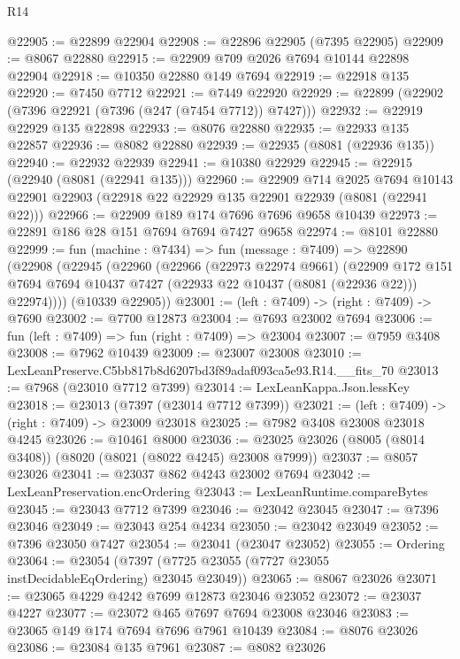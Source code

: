 \begin{lexlean}{R14}
\begin{coremodule}
@22905 := @22899 @22904
@22908 := @22896 @22905 (@7395 @22905)
@22909 := @8067 @22880
@22915 := @22909 @709 @2026 @7694 @10144 @22898 @22904
@22918 := @10350 @22880 @149 @7694
@22919 := @22918 @135
@22920 := @7450 @7712
@22921 := @7449 @22920
@22929 := @22899 (@22902 (@7396 @22921 (@7396 (@247 (@7454 @7712)) @7427)))
@22932 := @22919 @22929 @135 @22898
@22933 := @8076 @22880
@22935 := @22933 @135 @22857
@22936 := @8082 @22880
@22939 := @22935 (@8081 (@22936 @135))
@22940 := @22932 @22939
@22941 := @10380 @22929
@22945 := @22915 (@22940 (@8081 (@22941 @135)))
@22960 := @22909
    @714
    @2025
    @7694
    @10143
    @22901
    @22903
    (@22918 @22 @22929 @135 @22901 @22939 (@8081 (@22941 @22)))
@22966 := @22909 @189 @174 @7696 @7696 @9658 @10439
@22973 := @22891 @186 @28 @151 @7694 @7694 @7427 @9658
@22974 := @8101 @22880
@22999 := fun (machine : @7434) =>
  fun (message : @7409) =>
  @22890
    (@22908
      (@22945
        (@22960
          (@22966
            (@22973 @22974 @9661)
            (@22909
              @172
              @151
              @7694
              @7694
              @10437
              @7427
              (@22933 @22 @10437 (@8081 (@22936 @22)))
              @22974))))
      (@10339 @22905))
@23001 := (left : @7409) -> (right : @7409) -> @7690
@23002 := @7700 @12873
@23004 := @7693 @23002 @7694
@23006 := fun (left : @7409) => fun (right : @7409) => @23004
@23007 := @7959 @3408
@23008 := @7962 @10439
@23009 := @23007 @23008
@23010 := LexLeanPreserve.C5bb817b8d6207bd3f89adaf093ca5e93.R14.__fits_70
@23013 := @7968 (@23010 @7712 @7399)
@23014 := LexLeanKappa.Json.lessKey
@23018 := @23013 (@7397 (@23014 @7712 @7399))
@23021 := (left : @7409) -> (right : @7409) -> @23009 @23018
@23025 := @7982 @3408 @23008 @23018 @4245
@23026 := @10461 @8000
@23036 := @23025 @23026 (@8005 (@8014 @3408)) (@8020 (@8021 (@8022 @4245) @23008 @7999))
@23037 := @8057 @23026
@23041 := @23037 @862 @4243 @23002 @7694
@23042 := LexLeanPreservation.encOrdering
@23043 := LexLeanRuntime.compareBytes
@23045 := @23043 @7712 @7399
@23046 := @23042 @23045
@23047 := @7396 @23046
@23049 := @23043 @254 @4234
@23050 := @23042 @23049
@23052 := @7396 @23050 @7427
@23054 := @23041 (@23047 @23052)
@23055 := Ordering
@23064 := @23054 (@7397 (@7725 @23055 (@7727 @23055 instDecidableEqOrdering) @23045 @23049))
@23065 := @8067 @23026
@23071 := @23065 @4229 @4242 @7699 @12873 @23046 @23052
@23072 := @23037 @4227
@23077 := @23072 @465 @7697 @7694 @23008 @23046
@23083 := @23065 @149 @174 @7694 @7696 @7961 @10439
@23084 := @8076 @23026
@23086 := @23084 @135 @7961
@23087 := @8082 @23026

\end{coremodule}
\end{lexlean}
